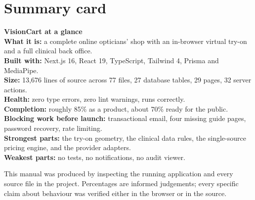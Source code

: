 \documentclass[11pt,a4paper]{report}
\newcommand{\keybox}[2]{%
  \begin{center}
  \begin{minipage}{0.94\textwidth}
  \colorbox{vclight}{\parbox{\dimexpr\textwidth-2\fboxsep}{%
    \vspace{3pt}\textbf{\color{vcblue}#1}\\[3pt]#2\vspace{4pt}}}
  \end{minipage}
  \end{center}}
\begin{document}
\chapter{Summary card}

\keybox{VisionCart at a glance}{
\textbf{What it is:} a complete online opticians' shop with an in-browser
virtual try-on and a full clinical back office.\\[4pt]
\textbf{Built with:} Next.js 16, React 19, TypeScript, Tailwind 4, Prisma and
MediaPipe.\\[4pt]
\textbf{Size:} 13{,}676 lines of source across 77 files, 27 database tables,
29 pages, 32 server actions.\\[4pt]
\textbf{Health:} zero type errors, zero lint warnings, runs correctly.\\[4pt]
\textbf{Completion:} roughly 85\% as a product, about 70\% ready for the
public.\\[4pt]
\textbf{Blocking work before launch:} transactional email, four missing guide
pages, password recovery, rate limiting.\\[4pt]
\textbf{Strongest parts:} the try-on geometry, the clinical data rules, the
single-source pricing engine, and the provider adapters.\\[4pt]
\textbf{Weakest parts:} no tests, no notifications, no audit viewer.}

\vfill
\begin{center}
\color{vcgrey}\small
This manual was produced by inspecting the running application and every
source file in the project. Percentages are informed judgements; every
specific claim about behaviour was verified either in the browser or in the
source.
\end{center}
\end{document}
